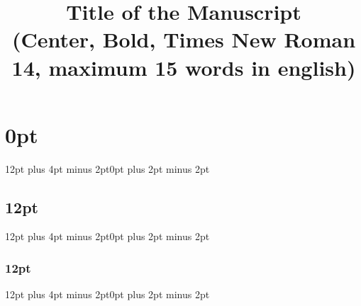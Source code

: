 \documentclass{article}
\begin{document}
\titlespacing\section{0pt}{12pt plus 4pt minus 2pt}{0pt plus 2pt minus 2pt}
\titlespacing\subsection{12pt}{12pt plus 4pt minus 2pt}{0pt plus 2pt minus 2pt}
\titlespacing\subsubsection{12pt}{12pt plus 4pt minus 2pt}{0pt plus 2pt minus 2pt}



\titleformat{\author}{\normalfont\fontsize{10}{15}\bfseries}{\thesection}{1em}{}

\title{\textbf{\huge Title of the Manuscript}\\
	(Center, Bold, Times New Roman 14, maximum 15 words in english)}
\date{}    
\end{document}
